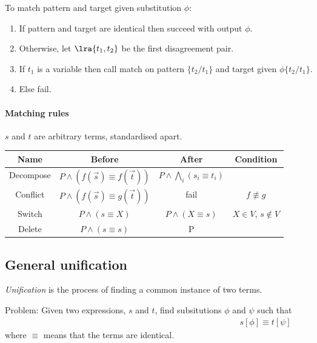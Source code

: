 \documentclass{article}
\begin{document}
To match pattern and target given substitution $\phi$:

\begin{enumerate}
	\item If pattern and target are identical then succeed with output $\phi$.
	\item Otherwise, let $\lra{t_1, t_2}$ be the first disagreement pair.
	\item If $t_1$ is a variable then call match on pattern $\{t_2/t_1\}$ and target given $\phi\{t_2/t_1\}$.
	\item Else fail.
\end{enumerate}

\paragraph*{Matching rules}
$s$ and $t$ are arbitrary terms, standardised apart.
\begin{center}
	\begin{tabular}{c | c | c | c}
		\textbf{Name} & \textbf{Before}                        & \textbf{After}                        & \textbf{Condition}     \\\hline
		Decompose     & $P\wedge (f(\vec s) \equiv f(\vec t))$ & $P\wedge\bigwedge_i (s_i \equiv t_i)$ &                        \\\hline
		Conflict      & $P\wedge (f(\vec s) \equiv g(\vec t))$ & fail                                  & $f\not\equiv g$        \\\hline
		Switch        & $P\wedge (s\equiv X)$                  & $P\wedge(X\equiv s)$                  & $X\in V$, $s\not\in V$ \\\hline
		Delete        & $P\wedge (s\equiv s)$                  & P                                     &
	\end{tabular}
\end{center}

\subsection{General unification}

\begin{definition}
	\emph{Unification} is the process of finding a common instance of two terms.

	Problem: Given two expressions, $s$ and $t$, find subsitutions
	$\phi$ and $\psi$ such that
	\begin{align*}
		s[\phi] \equiv t[\psi]
	\end{align*}
	where $\equiv$ means that the terms are identical.
\end{definition}
\end{document}
